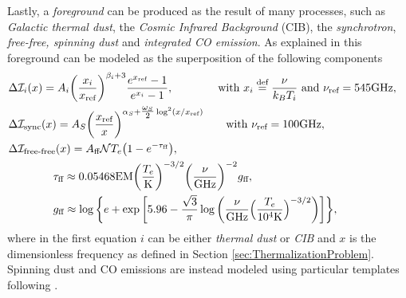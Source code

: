 Lastly, a \emph{foreground} can be produced as the result of many processes, such as \emph{Galactic thermal dust}, the \emph{Cosmic Infrared Background} (CIB), the \emph{synchrotron}, \emph{free-free, spinning dust} and \emph{integrated CO emission}. As explained in \cite{constraininginflationarypotentialspectral} this foreground can be modeled as the superposition of the following components
\begin{align}
    &\Delta \mathcal I_i(x)=A_i\bigg(\frac{x_i}{x_{\text{ref}}}\bigg)^{\beta_i+3} \frac{e^{x_{\text{ref}}}-1}{e^{x_i}-1},\qquad\qquad\text{with } x_i\stackrel{\text{def}}{=}\frac{\nu}{k_BT_i}\text{ and } \nu_\text{ref}=545\text{GHz},\label{eq:FOR_i}\\
    &\Delta \mathcal{I}_\text{sync} (x)= A_S\bigg(\frac{x_\text{ref}}{x}\bigg)^{\alpha_S+\tfrac{\omega_S}2\log^2(x/x_\text{ref})}\qquad \text{with }\nu_\text{ref}=100\text{GHz},\label{eq:FOR_sync}\\\nonumber
    &\Delta \mathcal{I}_\text{free-free}(x)= A_\text{ff} \mathcal{ N} T_e\big(1-e^{-\tau_{\text{ff}}}\big),&\\
    &\qquad\qquad\tau_\text{ff}\approx 0.05468\text{EM}\bigg(\frac{T_e}{\text{K}}\bigg)^{-3/2}\bigg(\frac{\nu}{\text{GHz}}\bigg)^{-2}g_\text{ff},& \\ &\qquad\qquad g_\text{ff}\approx \log\bigg\{ e+\exp\bigg[5.96-\frac{\sqrt{3}}{\pi}\log\bigg(\frac{\nu}{\text{GHz}}\Big(\frac{T_e}{10^4\text{K}}\Big)^{-3/2}\bigg)\bigg]\bigg\},\nonumber
\end{align}  
where in the first equation $i$ can be either \emph{thermal dust} or \emph{CIB} and $x$ is the dimensionless frequency as defined in Section \ref{sec:ThermalizationProblem}. Spinning dust and CO emissions are instead modeled using particular templates following \cite{refId0,10.1093/mnras/stx1653}.

